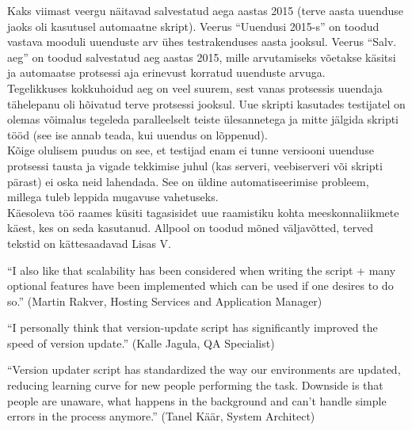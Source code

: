 \documentclass[12pt]{report}
\begin{document}
  Kaks viimast veergu näitavad salvestatud aega aastas 2015 (terve aasta uuenduse jaoks oli kasutusel automaatne skript). Veerus ``Uuendusi 2015-s'' on toodud vastava mooduli uuenduste arv ühes testrakenduses aasta jooksul. Veerus ``Salv. aeg'' on toodud salvestatud aeg aastas 2015, mille arvutamiseks võetakse käsitsi ja automaatse protsessi aja erinevust korratud uuenduste arvuga.\\
  
  Tegelikkuses kokkuhoidud aeg on veel suurem, sest vanas protsessis uuendaja tähelepanu oli hõivatud terve protsessi jooksul. Uue skripti kasutades testijatel on olemas võimalus tegeleda paralleelselt teiste ülesannetega ja mitte jälgida skripti tööd (see ise annab teada, kui uuendus on lõppenud).\\
  
  Kõige olulisem puudus on see, et testijad enam ei tunne versiooni uuenduse protsessi tausta ja vigade tekkimise juhul (kas serveri, veebiserveri või skripti pärast) ei oska neid lahendada. See on üldine automatiseerimise probleem, millega tuleb leppida mugavuse vahetuseks.\\
  
   Käesoleva töö raames küsiti tagasisidet uue raamistiku kohta meeskonnaliikmete käest, kes on seda kasutanud. Allpool on toodud mõned väljavõtted, terved tekstid on kättesaadavad Lisas V.\\
   
   \begin{displayquote}
   ``I also like that scalability has been considered when writing the script + many optional features have been implemented which can be used if one desires to do so.'' (Martin Rakver, Hosting Services and Application Manager)
   \end{displayquote}
   
   \begin{displayquote}
   ``I personally think that version-update script has significantly improved the speed of version update.'' (Kalle Jagula, QA Specialist)
   \end{displayquote}
   
   \begin{displayquote}
    ``Version updater script has standardized the way our environments are updated, reducing learning curve for new people performing the task. Downside is that people are unaware, what happens in the background and can't handle simple errors in the process anymore.'' (Tanel Käär, System Architect)
    \end{displayquote}
    
\end{document}
